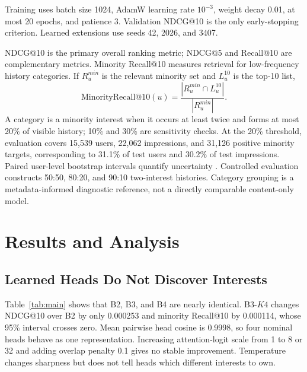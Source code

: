 Training uses batch size 1024, AdamW learning rate $10^{-3}$, weight decay 0.01, at most 20 epochs, and patience 3. Validation NDCG@10 is the only early-stopping criterion. Learned extensions use seeds 42, 2026, and 3407.

NDCG@10 is the primary overall ranking metric; NDCG@5 and Recall@10 are complementary metrics. Minority Recall@10 measures retrieval for low-frequency history categories. If $R_u^{min}$ is the relevant minority set and $L_u^{10}$ is the top-10 list,
\begin{equation}
\mathrm{MinorityRecall@10}(u)=
\frac{|R_u^{min}\cap L_u^{10}|}{|R_u^{min}|}.
\end{equation}
A category is a minority interest when it occurs at least twice and forms at most 20\% of visible history; 10\% and 30\% are sensitivity checks. At the 20\% threshold, evaluation covers 15,539 users, 22,062 impressions, and 31,126 positive minority targets, corresponding to 31.1\% of test users and 30.2\% of test impressions. Paired user-level bootstrap intervals quantify uncertainty \cite{efron1979bootstrap}. Controlled evaluation constructs 50:50, 80:20, and 90:10 two-interest histories. Category grouping is a metadata-informed diagnostic reference, not a directly comparable content-only model.

\section{Results and Analysis}
\subsection{Learned Heads Do Not Discover Interests}
Table~\ref{tab:main} shows that B2, B3, and B4 are nearly identical. B3-$K4$ changes NDCG@10 over B2 by only 0.000253 and minority Recall@10 by 0.000114, whose 95\% interval crosses zero. Mean pairwise head cosine is 0.9998, so four nominal heads behave as one representation. Increasing attention-logit scale from 1 to 8 or 32 and adding overlap penalty 0.1 gives no stable improvement. Temperature changes sharpness but does not tell heads which different interests to own.

